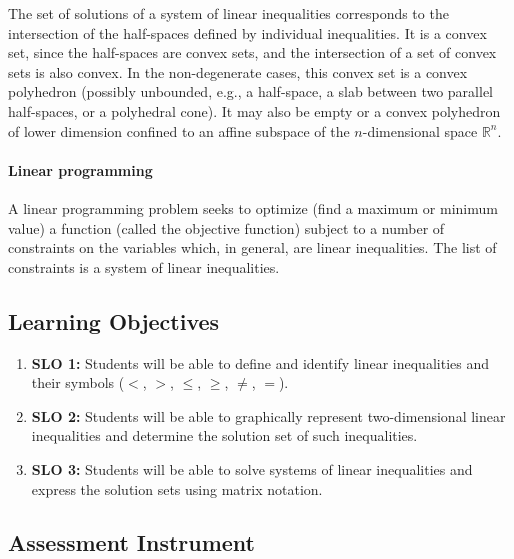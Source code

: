 The set of solutions of a system of linear inequalities corresponds to the intersection of the half-spaces defined by individual inequalities. It is a convex set, since the half-spaces are convex sets, and the intersection of a set of convex sets is also convex. In the non-degenerate cases, this convex set is a convex polyhedron (possibly unbounded, e.g., a half-space, a slab between two parallel half-spaces, or a polyhedral cone). It may also be empty or a convex polyhedron of lower dimension confined to an affine subspace of the $n$-dimensional space $\mathbb{R}^n$.



\paragraph{Linear programming}



A linear programming problem seeks to optimize (find a maximum or minimum value) a function (called the objective function) subject to a number of constraints on the variables which, in general, are linear inequalities. The list of constraints is a system of linear inequalities.

\subsection{Learning Objectives}

\begin{enumerate}
    \item \textbf{SLO 1:} Students will be able to define and identify linear inequalities and their symbols ($<$, $>$, $\leq$, $\geq$, $\neq$, $=$).
    \item \textbf{SLO 2:} Students will be able to graphically represent two-dimensional linear inequalities and determine the solution set of such inequalities.
    \item \textbf{SLO 3:} Students will be able to solve systems of linear inequalities and express the solution sets using matrix notation.
\end{enumerate}

\subsection{Assessment Instrument}

